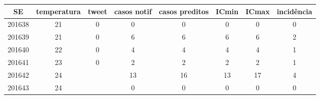 \begin{tabular}{c|ccccccc}
  \hline
SE & temperatura & tweet & casos notif & casos preditos & ICmin & ICmax & incidência \\ 
  \hline
201638 & 21 & 0 & 0 & 0 & 0 & 0 & 0 \\ 
  201639 & 21 & 0 & 6 & 6 & 6 & 6 & 2 \\ 
  201640 & 22 & 0 & 4 & 4 & 4 & 4 & 1 \\ 
  201641 & 23 & 0 & 2 & 2 & 2 & 2 & 1 \\ 
  201642 & 24 &  & 13 & 16 & 13 & 17 & 4 \\ 
  201643 & 24 &  & 0 & 0 & 0 & 0 & 0 \\ 
   \hline
\end{tabular}
